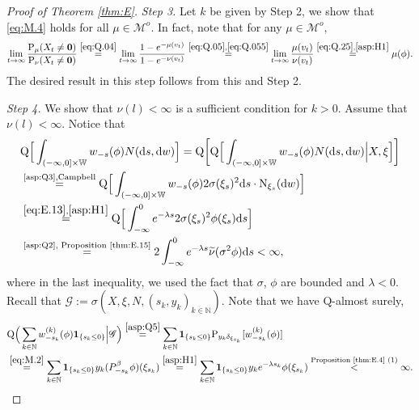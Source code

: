 \documentclass[12pt,a4paper]{amsart}
\numberwithin{equation}{section}
\theoremstyle{plain}
\theoremstyle{definition}
\theoremstyle{remark}
\begin{document}
\begin{proof}[Proof of Theorem \ref{thm:E}]
\emph{Step 3.}
	Let $k$ be given by Step 2, we show that \eqref{eq:M.4} holds for all $\mu\in \mathcal M^o$.
	In fact, note that for any $\mu\in \mathcal M^o$,
\begin{align}
	\lim_{t\to \infty}\frac{\mathrm P_\mu(X_t \neq \mathbf 0)}{\mathrm P_\nu(X_t \neq \mathbf 0)}
	\overset{\eqref{eq:Q.04}} = \lim_{t\to \infty}\frac{1- e^{-\mu(v_t)}}{1- e^{-\nu(v_t)}}
	\overset{\eqref{eq:Q.05}, \eqref{eq:Q.055}} = \lim_{t\to \infty}\frac{\mu(v_t)}{\nu(v_t)}
	\overset{\eqref{eq:Q.25}, \eqref{asp:H1}} = \mu(\phi).
\end{align}
	The desired result in this step follows from this and Step 2.

\emph{Step 4.}
	We show that  $\nu(l)<\infty$ is a sufficient condition for $k>0$.
	Assume that $\nu(l)<\infty$.
	Notice that
\begin{align}
	&\mathrm Q\Big[\int_{(-\infty,0]\times \mathbb W}w_{-s}(\phi) N({\mathrm d}s, {\mathrm d}w) \Big]
	= \mathrm Q\bigg[\mathrm Q\Big[\int_{(-\infty,0]\times \mathbb W}w_{-s}(\phi) N({\mathrm d}s, {\mathrm d}w) \Big | X, \xi \Big]\bigg]
	\\& \overset{\text{\eqref{asp:Q3},Campbell}}= \mathrm Q\Big[\int_{(-\infty,0]\times \mathbb W}w_{-s}(\phi) 2 \sigma(\xi_s)^2 {\mathrm d}s \cdot \mathrm N_{\xi_s}({\mathrm d}w) \Big]
	\\& \overset{\eqref{eq:E.13}, \eqref{asp:H1}}=\mathrm Q \Big[\int^0_{-\infty} e^{-\lambda s} 2\sigma(\xi_s)^2 \phi(\xi_s) \mathrm ds\Big]
	\\&\label{eq:E.64}\overset{\text{\eqref{asp:Q2}, Proposition \ref{thm:E.15}}}= 2\int^0_{-\infty} e^{-\lambda s} \widetilde\nu(\sigma^2 \phi) \mathrm ds
	<\infty,
	\end{align}
	where in the last inequality, we used the fact that $\sigma$, $\phi$ are bounded and $\lambda < 0$.
	Recall that $\mathscr G := \sigma(X, \xi, N, (s_k, y_k)_{k\in \mathbb N})$. Note that we have $\mathrm Q$-almost surely,
\begin{align}
	& \mathrm Q\Big(\sum_{k\in \mathbb N}
	w^{(k)}_{-s_k}(\phi) \mathbf 1_{\{s_k \leq 0\}}\Big|\mathscr G \Big)
	\overset{\eqref{asp:Q5}}= \sum_{k\in \mathbb N} \mathbf 1_{\{s_k \leq 0\}} \mathrm P_{y_k\delta_{\xi_{s_k}}}[w^{(k)}_{-s_k}(\phi)]
	\\ &\overset{\eqref{eq:M.2}}= \sum_{k\in \mathbb N}
	\mathbf 1_{\{s_k \leq 0\}} y_k (P_{-s_k}^\beta \phi)(\xi_{s_k})
	\overset{\eqref{asp:H1}} = \sum_{k\in \mathbb N} \mathbf 1_{\{s_k \leq 0\}} y_k e^{-\lambda s_k} \phi(\xi_{s_k})
	\overset{\text{Proposition \ref{thm:E.4} (1)}} < \infty.

\end{align}
\end{proof}
\end{document}
